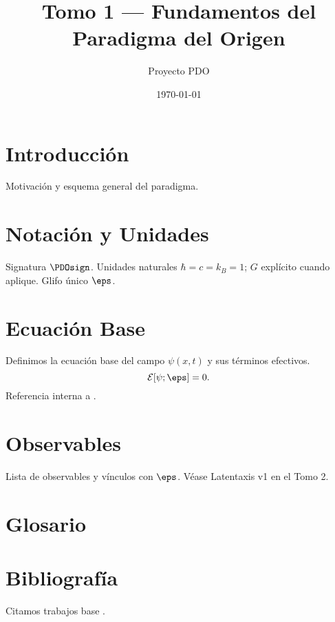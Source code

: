 \documentclass[11pt]{article}
\title{Tomo 1 — Fundamentos del Paradigma del Origen}
\author{Proyecto PDO}
\date{\today}
\begin{document}
\maketitle
\tableofcontents

\section{Introducción}\label{sec:intro}
Motivación y esquema general del paradigma.

\section{Notación y Unidades}\label{sec:units}
Signatura \(\PDOsign\). Unidades naturales \(\hbar=c=k_B=1\); \(G\) explícito cuando aplique. Glifo único \(\eps\).

\section{Ecuación Base}\label{sec:eqbase}
Definimos la ecuación base del campo \(\psi(x,t)\) y sus términos efectivos.
\begin{equation}
\mathcal{E}[\psi;\eps] = 0.
\label{eq:base}
\end{equation}
Referencia interna a .

\section{Observables}\label{sec:obs}
Lista de observables y vínculos con \(\eps\). Véase Latentaxis v1 en el Tomo 2.

\section{Glosario}
\printglossaries

\section{Bibliografía}
Citamos trabajos base \cite{Planck2018,Alcubierre1994,EFTbook}.
\printbibliography
\end{document}

